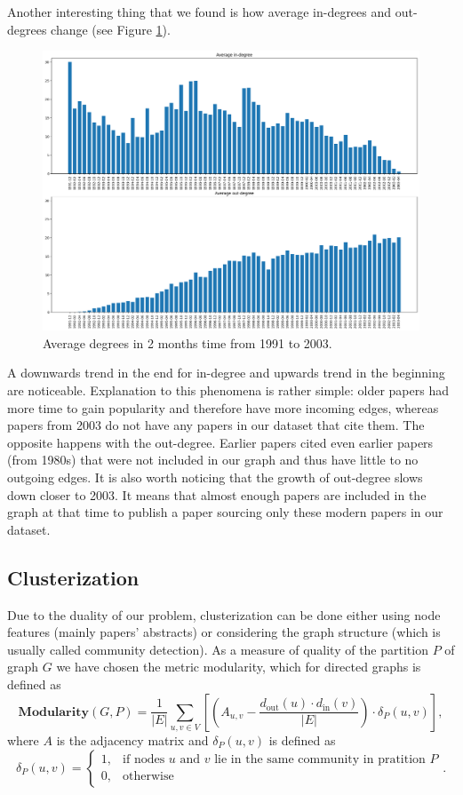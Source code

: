 \documentclass{article}
\begin{document}
Another interesting thing that we found is how average in-degrees and out-degrees change (see Figure \ref{plot:average_degree_per_month}).
\begin{figure}[h]
\centering
\includegraphics[width=1\linewidth]{degrees_over_time.png}
\caption{Average degrees in 2 months time from 1991 to 2003.} \label{plot:average_degree_per_month}
\end{figure}
A downwards trend in the end for in-degree and upwards trend in the beginning are noticeable. Explanation to this phenomena is rather simple: older papers had more time to gain popularity and therefore have more incoming edges, whereas papers from 2003 do not have any papers in our dataset that cite them. The opposite happens with the out-degree. Earlier papers cited even earlier papers (from 1980s) that were not included in our graph and thus have little to no outgoing edges. It is also worth noticing that the growth of out-degree slows down closer to 2003. It means that almost enough papers are included in the graph at that time to publish a paper sourcing only these modern papers in our dataset.

\subsection{Clusterization}
Due to the duality of our problem, clusterization can be done either using node features (mainly papers' abstracts) or considering the graph structure (which is usually called community detection). As a measure of quality of the partition $P$ of graph $G$ we have chosen the metric modularity, which for directed graphs is defined as
$$\textbf{Modularity}(G, P) = \frac{1}{|E|} \sum_{u, v \in V} \left[\left(A_{u, v} - \frac{d_{\text{out}}(u)\cdot d_{\text{in}}(v)}{|E|}\right)\cdot \delta_P(u, v)\right],$$
where $A$  is the adjacency matrix and $\delta_P(u, v)$ is defined as
$$\delta_P(u, v) =
\begin{cases}
1, & \text{if nodes } u \text{ and } v \text{ lie in the same community in pratition } P \\
0, & \text{otherwise}
\end{cases}.
$$ 
\end{document}
